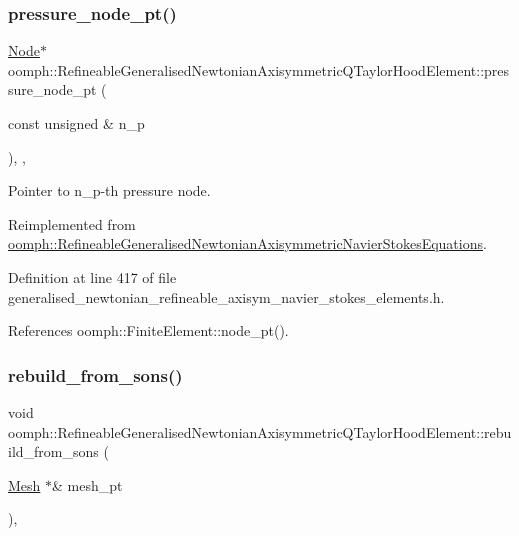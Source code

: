 \subsubsection{\texorpdfstring{pressure\+\_\+node\+\_\+pt()}{pressure\_node\_pt()}}
{\footnotesize\ttfamily \hyperlink{classoomph_1_1Node}{Node}$\ast$ oomph\+::\+Refineable\+Generalised\+Newtonian\+Axisymmetric\+Q\+Taylor\+Hood\+Element\+::pressure\+\_\+node\+\_\+pt (\begin{DoxyParamCaption}\item[{const unsigned \&}]{n\+\_\+p }\end{DoxyParamCaption})\hspace{0.3cm}{\ttfamily [inline]}, {\ttfamily [private]}, {\ttfamily [virtual]}}



Pointer to n\+\_\+p-\/th pressure node. 



Reimplemented from \hyperlink{classoomph_1_1RefineableGeneralisedNewtonianAxisymmetricNavierStokesEquations_a626f83e867f6d2fda5d9ed20a265c6ca}{oomph\+::\+Refineable\+Generalised\+Newtonian\+Axisymmetric\+Navier\+Stokes\+Equations}.



Definition at line 417 of file generalised\+\_\+newtonian\+\_\+refineable\+\_\+axisym\+\_\+navier\+\_\+stokes\+\_\+elements.\+h.



References oomph\+::\+Finite\+Element\+::node\+\_\+pt().

\mbox{\label{classoomph_1_1RefineableGeneralisedNewtonianAxisymmetricQTaylorHoodElement_ac380d6d9f19c115743fd5234ab5b8b6c}} 
\subsubsection{\texorpdfstring{rebuild\+\_\+from\+\_\+sons()}{rebuild\_from\_sons()}}
{\footnotesize\ttfamily void oomph\+::\+Refineable\+Generalised\+Newtonian\+Axisymmetric\+Q\+Taylor\+Hood\+Element\+::rebuild\+\_\+from\+\_\+sons (\begin{DoxyParamCaption}\item[{\hyperlink{classoomph_1_1Mesh}{Mesh} $\ast$\&}]{mesh\+\_\+pt }\end{DoxyParamCaption})\hspace{0.3cm}{\ttfamily [inline]}, {\ttfamily [virtual]}}



